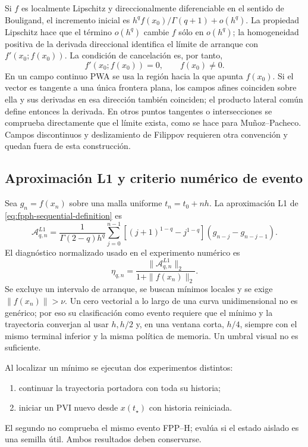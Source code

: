 Si \(f\) es localmente Lipschitz y direccionalmente diferenciable en el
sentido de Bouligand, el incremento inicial es
\(h^q f(x_0)/\Gamma(q+1)+o(h^q)\). La propiedad Lipschitz hace que
el término \(o(h^q)\) cambie \(f\) sólo en \(o(h^q)\); la homogeneidad
positiva de la derivada direccional identifica el límite de arranque con
\(f'(x_0;f(x_0))\). La condición de cancelación es, por tanto,
\begin{equation}
 f'(x_0;f(x_0))=0,\qquad f(x_0)\neq0.
 \label{eq:pp-bouligand}
\end{equation}
En un campo continuo PWA se usa la región hacia la que apunta \(f(x_0)\).
Si el vector es tangente a una única frontera plana, los campos afines
coinciden sobre ella y sus derivadas en esa dirección también coinciden;
el producto lateral común define entonces la derivada. En otros puntos
tangentes o intersecciones se comprueba directamente que el límite exista,
como se hace para Muñoz--Pacheco. Campos discontinuos y deslizamiento de
Filippov requieren otra convención y quedan fuera de esta construcción.

\subsection{Aproximación L1 y criterio numérico de evento}

Sea \(g_n=f(x_n)\) sobre una malla uniforme \(t_n=t_0+nh\). La aproximación L1
de \cref{eq:fpph-sequential-definition} es
\begin{equation}
 \mathcal A_{q,n}^{L1}
 =\frac1{\Gamma(2-q)h^q}
 \sum_{j=0}^{n-1}
 \left[(j+1)^{1-q}-j^{1-q}\right]
 (g_{n-j}-g_{n-j-1}).
 \label{eq:fpph-l1}
\end{equation}
El diagnóstico normalizado usado en el experimento numérico es
\begin{equation}
 \eta_{q,n}
 =\frac{\|\mathcal A_{q,n}^{L1}\|_2}{1+\|f(x_n)\|_2}.
 \label{eq:fpph-normalized}
\end{equation}
Se excluye un intervalo de arranque, se buscan mínimos locales y se exige
\(\|f(x_n)\|>\nu\). Un cero vectorial a lo largo de una curva unidimensional
no es genérico; por eso su clasificación como evento requiere que el mínimo y
la trayectoria converjan al usar \(h,h/2\) y, en una ventana corta, \(h/4\), siempre con el
mismo terminal inferior y la misma política de memoria. Un umbral visual no
es suficiente.

Al localizar un mínimo se ejecutan dos experimentos distintos:
\begin{enumerate}
 \item continuar la trayectoria portadora con toda su historia;
 \item iniciar un PVI nuevo desde \(x(t_\star)\) con historia reiniciada.
\end{enumerate}
El segundo no comprueba el mismo evento FPP--H; evalúa si el estado aislado es
una semilla útil. Ambos resultados deben conservarse.

